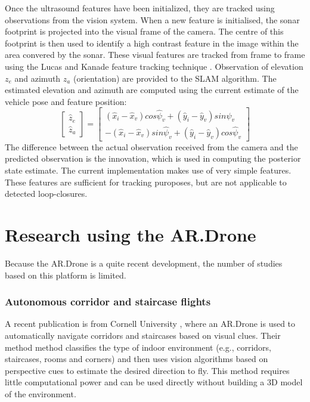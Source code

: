Once the ultrasound features have been initialized, they are tracked using observations from the vision system.
When a new feature is initialised, the sonar footprint is projected into the visual frame of the camera.
The centre of this footprint is then used to identify a high contrast feature in the image within the area convered by the sonar.
These visual features are tracked from frame to frame using the Lucas and Kanade feature tracking technique \cite{lucas1998application}.
Observation of elevation $z_e$ and azimuth $z_a$ (orientation) are provided to the SLAM algorithm.
The estimated elevation and azimuth are computed using the current estimate of the vehicle pose and feature position:
\begin{equation}
\left[ {
\begin{array}{c} \hat{z}_e \\ \hat{z}_a \end{array}
} \right] =
\left[ {
\begin{array}{c}
	(\hat{x}_i - \hat{x}_v) cos \hat{\psi}_v + (\hat{y}_i - \hat{y}_v) sin \hat{\psi}_v \\
	-(\hat{x}_i - \hat{x}_v) sin \hat{\psi}_v + (\hat{y}_i - \hat{y}_v) cos \hat{\psi}_v
\end{array}
} \right]
\end{equation}
The difference between the actual observation received from the camera and the predicted observation is the innovation, which is used in computing the posterior state estimate.
The current implementation makes use of very simple features.
These features are sufficient for tracking puroposes, but are not applicable to detected loop-closures.


\section{Research using the AR.Drone}
Because the AR.Drone is a quite recent development, the number of studies based on this platform is limited.

\subsubsection{Autonomous corridor and staircase flights}

A recent publication is from Cornell University \cite{Bills2011icra}, where an AR.Drone is used to automatically navigate corridors and staircases based on visual clues.
Their method method classifies the type of indoor environment (e.g., corridors, staircases, rooms and corners) and then uses vision algorithms based on perspective cues to estimate the desired direction to fly.
This method requires little computational power and can be used directly without building a 3D model of the environment.

